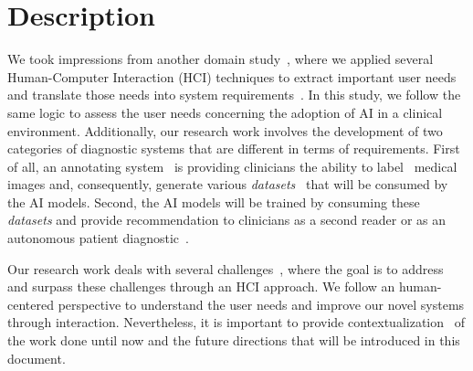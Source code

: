 
\section{Description}
\label{sec:sec002}


We took impressions from another domain study~\cite{https://doi.org/10.13140/RG.2.2.32577.92001/1, https://doi.org/10.13140/RG.2.2.31319.62885/1}, where we applied several Human-Computer Interaction (HCI) techniques to extract important user needs and translate those needs into system requirements~\cite{calisto2017mimbcdui, calisto2019itmedex, https://doi.org/10.13140/rg.2.2.29816.70409, calisto2015aqmgasa}.
In this study, we follow the same logic to assess the user needs concerning the adoption of AI in a clinical environment.
Additionally, our research work involves the development of two categories of diagnostic systems that are different in terms of requirements.
First of all, an annotating system~\cite{10.1145/3132272.3134111, https://doi.org/10.13140/rg.2.2.14792.55049, 10.1145/3399715.3399744} is providing clinicians the ability to label~\cite{10.13140/RG.2.2.26143.51365} medical images and, consequently, generate various {\it datasets}~\cite{https://doi.org/10.13140/rg.2.2.16086.88649} that will be consumed by the AI models.
Second, the AI models will be trained by consuming these {\it datasets} and provide recommendation to clinicians as a second reader or as an autonomous patient diagnostic~\cite{calisto2019midaaiarfuv, https://doi.org/10.13140/rg.2.2.25412.68486, 10.13140/RG.2.2.32854.40000}.

Our research work deals with several challenges~\cite{https://doi.org/10.13140/RG.2.2.25718.65606, 10.13140/RG.2.2.28345.52322, 10.13140/RG.2.2.22788.07048, LesionsTypes}, where the goal is to address and surpass these challenges through an HCI approach.
We follow an human-centered perspective to understand the user needs and improve our novel systems through interaction.
Nevertheless, it is important to provide contextualization~\cite{https://doi.org/10.13140/RG.2.2.14314.95685/2} of the work done until now and the future directions that will be introduced in this document.

